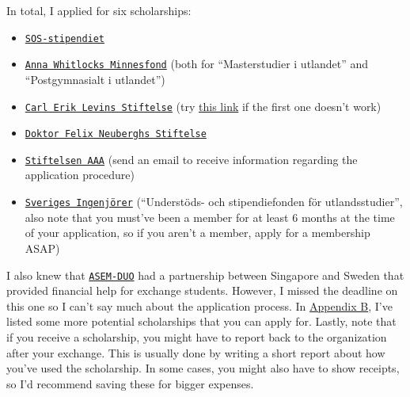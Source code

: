 In total, I applied for six scholarships:
\begin{itemize}
    \item \href{https://www.globalgrant.com/sos-stipendier}{\texttt{SOS-stipendiet}}
    \item \href{https://www.whitlocks.se/anna-whitlock/}{\texttt{Anna Whitlocks Minnesfond}} (both for ``Masterstudier i utlandet'' and ``Postgymnasialt i utlandet'')
    \item \href{https://stiftelseansokan.seb.se/sbs/carleriklevin/grandid/user/login/selectidp/bankid.deviceChoice}{\texttt{Carl Erik Levins Stiftelse}} (try \href{https://stiftelseansokan.se}{this link} if the first one doesn't work)
    \item \href{https://www.felixneubergh.se}{\texttt{Doktor Felix Neuberghs Stiftelse}}
    \item \href{http://stipendieguiden.com/listing/stiftelsen-aaa/}{\texttt{Stiftelsen AAA}} (send an email to receive information regarding the application procedure)
    \item \href{https://www.sverigesingenjorer.se/medlemskap/stipendier/}{\texttt{Sveriges Ingenjörer}} (``Understöds- och stipendiefonden för utlandsstudier'', also note that you must've been a member for at least 6 months at the time of your application, so if you aren't a member, apply for a membership ASAP)
\end{itemize}
I also knew that \href{https://www.asemduo.org/02_programs/programs_02.php}{\texttt{ASEM-DUO}} had a partnership between Singapore and Sweden that provided financial help for exchange students. However, I missed the deadline on this one so I can't say much about the application process. In \hyperref[appB]{Appendix B}, I've listed some more potential scholarships that you can apply for. Lastly, note that if you receive a scholarship, you might have to report back to the organization after your exchange. This is usually done by writing a short report about how you've used the scholarship. In some cases, you might also have to show receipts, so I'd recommend saving these for bigger expenses.
